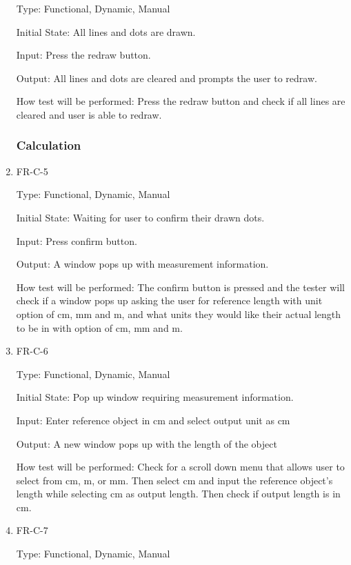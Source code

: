 \documentclass[12pt, titlepage]{article}
\begin{document}
\begin{enumerate}
					Type: Functional, Dynamic, Manual
					
					Initial State: All lines and dots are drawn.
					
					Input: Press the redraw button.
					
					Output: All lines and dots are cleared and prompts the user to redraw.
					
					How test will be performed: Press the redraw button and check if all lines are cleared and user is able to redraw.
					
					
\subsubsection{Calculation}


					\item{FR-C-5\\}
					
					Type: Functional, Dynamic, Manual
					
					Initial State: Waiting for user to confirm their drawn dots.
					
					Input: Press confirm button.
					
					Output: A window pops up with measurement information.
					
					How test will be performed: The confirm button is pressed and the tester will check if a window pops up asking the user for reference length with unit option of cm, mm and m, and what units they would like their actual length to be in with option of cm, mm and m.
				
					\item{FR-C-6\\}
					
					Type: Functional, Dynamic, Manual
					
					Initial State: Pop up window requiring measurement information.
					
					Input: Enter reference object in cm and select output unit as cm
					
					Output: A new window pops up with the length of the object
					
					How test will be performed: Check for a scroll down menu that allows user to select from cm, m, or mm. Then select cm and input the reference object's length while selecting cm as output length. Then check if output length is in cm.
					\item{FR-C-7\\}
					
					Type: Functional, Dynamic, Manual
					

\end{enumerate}
\end{document}
